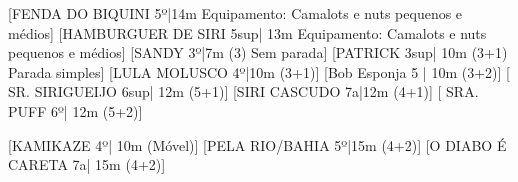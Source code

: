 
\begin{CGSectorRoutes}
    [FENDA DO BIQUINI 5º|14m
Equipamento: Camalots e nuts pequenos e médios]
    [HAMBURGUER DE SIRI 5sup| 13m
Equipamento: Camalots e nuts pequenos e médios]
    [SANDY 3º|7m (3) Sem parada]
    [PATRICK 3sup| 10m (3+1) Parada simples]
    [LULA MOLUSCO 4º|10m (3+1)]
    [Bob Esponja 5 | 10m (3+2)]
    [ SR. SIRIGUEIJO 6sup| 12m (5+1)]
    [SIRI CASCUDO 7a|12m (4+1)]
    [ SRA. PUFF 6º| 12m (5+2)]
\end{CGSectorRoutes}

\begin{CGSectorRoutes}
    [KAMIKAZE 4º| 10m (Móvel)]
    [PELA RIO/BAHIA 5º|15m (4+2)]
    [O DIABO É CARETA 7a| 15m (4+2)]
\end{CGSectorRoutes}

